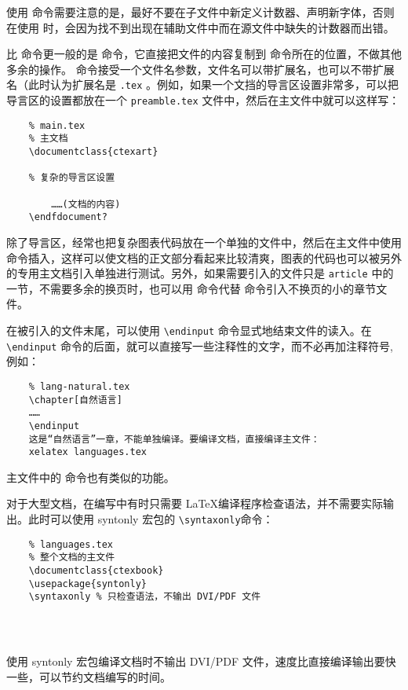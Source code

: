 使用 \verb|| 命令需要注意的是，最好不要在子文件中新定义计数器、声明新字体，否则在使用 \verb|| 时，会因为找不到出现在辅助文件中而在源文件中缺失的计数器而出错。

比 \verb|| 命令更一般的是 \verb|| 命令，它直接把文件的内容复制到 \verb|| 命令所在的位置，不做其他多余的操作。 \verb|| 命令接受一个文件名参数，文件名可以带扩展名，也可以不带扩展名（此时认为扩展名是 \verb|.tex| 。例如，如果一个文挡的导言区设置非常多，可以把导言区的设置都放在一个 \verb|preamble.tex| 文件中，然后在主文件中就可以这样写：

\begin{lstlisting}
    % main.tex
    % 主文档
    \documentclass{ctexart}
    
    % 复杂的导言区设置
    
        ……(文档的内容)
    \endfdocument?
\end{lstlisting}

除了导言区，经常也把复杂图表代码放在一个单独的文件中，然后在主文件中使用 \verb|| 命令插入，这样可以使文档的正文部分看起来比较清爽，图表的代码也可以被另外的专用主文档引入单独进行测试。另外，如果需要引入的文件只是 \verb|article| 中的一节，不需要多余的换页时，也可以用 \verb|| 命令代替 \verb|| 命令引入不换页的小的章节文件。

在被引入的文件末尾，可以使用 \verb|\endinput| 命令显式地结束文件的读入。在 \verb|\endinput| 命令的后面，就可以直接写一些注释性的文字，而不必再加注释符号,例如：

\begin{lstlisting}
    % lang-natural.tex
    \chapter[自然语言]
    ……
    \endinput
    这是“自然语言”一章，不能单独编译。要编译文档，直接编译主文件：
    xelatex languages.tex
\end{lstlisting}
主文件中的 \verb|| 命令也有类似的功能。

对于大型文档，在编写中有时只需要 \LaTeX 编译程序检查语法，并不需要实际输出。此时可以使用 syntonly 宏包的 \verb|\syntaxonly|命令：

\begin{lstlisting}
    % languages.tex
    % 整个文档的主文件
    \documentclass{ctexbook}
    \usepackage{syntonly}
    \syntaxonly % 只检查语法，不输出 DVI/PDF 文件
    
    
    
\end{lstlisting}
使用 syntonly 宏包编译文档时不输出 DVI/PDF 文件，速度比直接编译输出要快一些，可以节约文档编写的时间。

